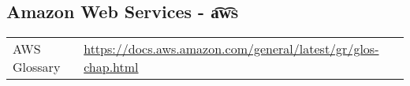 	\clearpage


\subsection*{Amazon Web Services - \t{a\t{ws}}}



\begin{flushleft}
	\begin{tabu} to \textwidth{X |X[2]}




AWS Glossary &
\url{https://docs.aws.amazon.com/general/latest/gr/glos-chap.html}\\ 

\end{tabu}
\end{flushleft}
	
	
	




